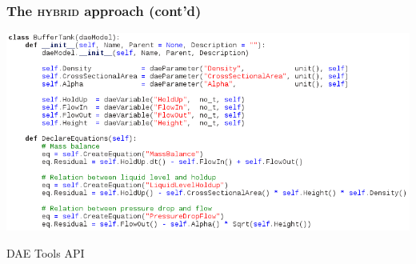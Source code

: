 \documentclass[compress,newPxFont,sthlmFooter]{beamer}
\begin{document}
\begin{frame}
\frametitle{The \textsc{hybrid} approach (cont'd)}
    \begin{center}
       \includegraphics[align=c, width=0.70\paperwidth]{daetools_model.png} \par
       {\scriptsize \textcolor{sthlmRed}{DAE Tools API}}
    \end{center}
\end{frame}
\end{document}
